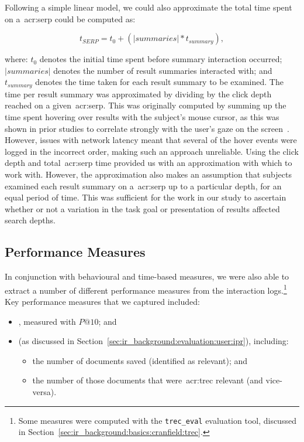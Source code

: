 Following a simple linear model, we could also approximate the total time spent on a~\gls{acr:serp} could be computed as:

\begin{equation*}
    t_{SERP} = t_{0} + (|summaries| * t_{summary}),
\end{equation*}

\noindent
where: $t_{0}$ denotes the initial time spent before summary interaction occurred; $|summaries|$ denotes the number of result summaries interacted with; and $t_{summary}$ denotes the time taken for each result summary to be examined. The time per result summary was approximated by dividing by the click depth reached on a given~\gls{acr:serp}. This was originally computed by summing up the time spent hovering over results with the subject's mouse cursor, as this was shown in prior studies to correlate strongly with the user's gaze on the screen~\citep{chen2001mouse_cursor, smucker2014judging_relevance_movements}. However, issues with network latency meant that several of the hover events were logged in the incorrect order, making such an approach unreliable. Using the click depth and total~\gls{acr:serp} time provided us with an approximation with which to work with. However, the approximation also makes an assumption that subjects examined each result summary on a~\gls{acr:serp} up to a particular depth, for an equal period of time. This was sufficient for the work in our study to ascertain whether or not a variation in the task goal or presentation of results affected search depths.

\subsection{Performance Measures}\label{sec:methodology:extracting:performance}
In conjunction with behavioural and time-based measures, we were also able to extract a number of different performance measures from the interaction logs.\footnote{Some measures were computed with the \texttt{trec\_eval} evaluation tool, discussed in Section~\ref{sec:ir_background:basics:cranfield:trec}.} Key performance measures that we captured included:

\begin{itemize}
    \item{, measured with $P@10$; and}
    \item{ (as discussed in Section~\ref{sec:ir_background:evaluation:user:ipr}), including:}
    
    \begin{itemize}
        \item{the number of documents saved (identified as relevant); and}
        \item{the number of those documents that were~\gls{acr:trec} relevant (and vice-versa).}
    \end{itemize}
\end{itemize}

